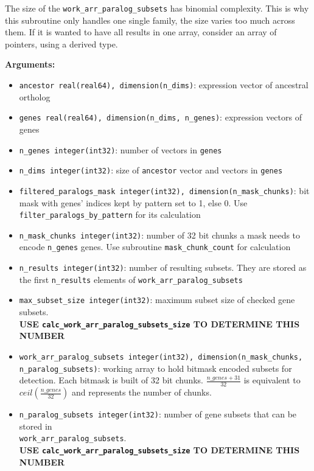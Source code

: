 \begin{enumerate}
        The size of the \lstinline!work_arr_paralog_subsets! has binomial complexity. This is why this subroutine only handles one single family, the size varies too much across them. If it is wanted to have all results in one array, consider an array of pointers, using a derived type.

        \textbf{Arguments:}
        \begin{itemize}
            \item \lstinline!ancestor real(real64), dimension(n_dims)!: expression vector of ancestral ortholog
            \item \lstinline!genes real(real64), dimension(n_dims, n_genes)!: expression vectors of genes
            \item \lstinline!n_genes integer(int32)!: number of vectors in \lstinline!genes!
            \item \lstinline!n_dims integer(int32)!: size of \lstinline!ancestor! vector and vectors in \lstinline!genes!
            \item \lstinline!filtered_paralogs_mask integer(int32), dimension(n_mask_chunks)!: bit mask with genes' indices kept by pattern set to 1, else 0. Use \lstinline!filter_paralogs_by_pattern! for its calculation
            \item \lstinline!n_mask_chunks integer(int32)!: number of 32 bit chunks a mask needs to encode \lstinline!n_genes! genes. Use subroutine \lstinline!mask_chunk_count! for calculation
            \item \lstinline!n_results integer(int32)!: number of resulting subsets. They are stored as the first \lstinline!n_results! elements of \lstinline!work_arr_paralog_subsets!
            \item \lstinline!max_subset_size integer(int32)!: maximum subset size of checked gene subsets. \\ \textbf{USE \lstinline!calc_work_arr_paralog_subsets_size! TO DETERMINE THIS NUMBER}
            \item \lstinline!work_arr_paralog_subsets integer(int32), dimension(n_mask_chunks, n_paralog_subsets)!: working array to hold bitmask encoded subsets for detection. Each bitmask is built of 32 bit chunks. \(\frac{n\_genes + 31}{32}\) is equivalent to \(ceil(\frac{n\_genes}{32})\) and represents the number of chunks.
            \item \lstinline!n_paralog_subsets integer(int32)!: number of gene subsets that can be stored in \\ \lstinline!work_arr_paralog_subsets!. \\ \textbf{USE \lstinline!calc_work_arr_paralog_subsets_size! TO DETERMINE THIS NUMBER}

\end{itemize}
\end{enumerate}
